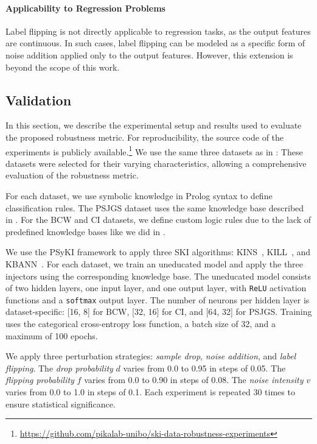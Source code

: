 %
\paragraph{Applicability to Regression Problems}
%
Label flipping is not directly applicable to regression tasks, as the output features are continuous.
%
In such cases, label flipping can be modeled as a specific form of noise addition applied only to the output features.
%
However, this extension is beyond the scope of this work.


\subsection{Validation}\label{subsec:empirical-study-on-the-robustness-of-ski-methods-validation}
%
In this section, we describe the experimental setup and results used to evaluate the proposed robustness metric.
%
For reproducibility, the source code of the experiments is publicly available.\footnote{\url{https://github.com/pikalab-unibo/ski-data-robustness-experiments}}
%
We use the same three datasets as in :
%
These datasets were selected for their varying characteristics, allowing a comprehensive evaluation of the robustness metric.


For each dataset, we use symbolic knowledge in Prolog syntax to define classification rules.
%
The \gls{PSJGS} dataset uses the same knowledge base described in .
%
For the \gls{BCW} and \gls{CI} datasets, we define custom logic rules due to the lack of predefined knowledge bases like we did in .


We use the \gls{PSyKI} framework to apply three \gls{SKI} algorithms: \gls{KINS}~\cite{DBLP:conf/cilc/MagniniCO22}, \gls{KILL}~\cite{DBLP:conf/woa/MagniniCO22}, and \gls{KBANN}~\cite{DBLP:conf/aaai/TowellSN90}.
%
For each dataset, we train an uneducated model and apply the three injectors using the corresponding knowledge base.
%
The uneducated model consists of two hidden layers, one input layer, and one output layer, with \texttt{ReLU} activation functions and a \texttt{softmax} output layer.
%
The number of neurons per hidden layer is dataset-specific: [16, 8] for \gls{BCW}, [32, 16] for \gls{CI}, and [64, 32] for \gls{PSJGS}.
%
Training uses the categorical cross-entropy loss function, a batch size of 32, and a maximum of 100 epochs.


We apply three perturbation strategies: \emph{sample drop}, \emph{noise addition}, and \emph{label flipping}.
%
The \emph{drop probability} \(d\) varies from 0.0 to 0.95 in steps of 0.05.
%
The \emph{flipping probability} \(f\) varies from 0.0 to 0.90 in steps of 0.08.
%
The \emph{noise intensity} \(v\) varies from 0.0 to 1.0 in steps of 0.1.
%
Each experiment is repeated 30 times to ensure statistical significance.

